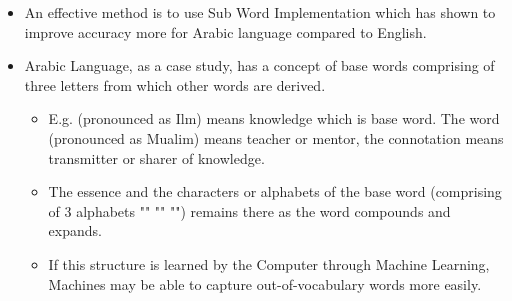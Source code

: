 \begin{itemize}
\begin{itemize}
            \item An effective method is to use Sub Word Implementation \cite{smit_advances_2021} which has shown to improve accuracy more for Arabic language compared to English. 
            \item Arabic Language, as a case study, has a concept of base words comprising of three letters from which other words are derived.
            \begin{itemize}
                \item E.g.  (pronounced as Ilm) means knowledge which is base word. The word  (pronounced as Mualim) means teacher or mentor, the connotation means transmitter or sharer of knowledge. 
                \item The essence and the characters or alphabets of the base word  (comprising of 3 alphabets "" "" "") remains there as the word compounds and expands. 
                \item If this structure is learned by the Computer through Machine Learning, Machines may be able to capture out-of-vocabulary words more easily. 
            \end{itemize}
        \end{itemize}
\end{itemize}


